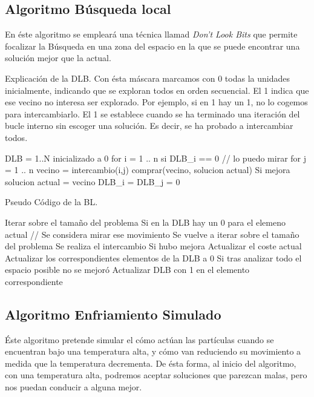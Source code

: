 \documentclass[10pt,a4paper]{article}
\begin{document}
\subsection{Algoritmo Búsqueda local}

En éste algoritmo se empleará una técnica llamad \textit{Don't Look Bits} que permite focalizar la Búsqueda en una zona del espacio en la que se puede encontrar una solución mejor que la actual.

Explicación de la DLB. Con ésta máscara marcamos con 0 todas la unidades inicialmente, indicando que se exploran todos en  orden secuencial. El 1 indica que ese vecino no interesa ser explorado. Por ejemplo, si en 1 hay un 1, no lo cogemos para intercambiarlo. El 1 se establece cuando se ha terminado una iteración del bucle interno sin escoger una solución. Es decir, se ha probado a intercambiar todos.

\begin{ccode}
        DLB = 1..N inicializado a 0
        for i = 1 .. n
            si DLB_i == 0 // lo puedo mirar
                for j = 1 .. n
                    vecino = intercambio(i,j)
                    comprar(vecino, solucion actual)
                    Si mejora solucion actual = vecino
                    DLB_i = DLB_j = 0
\end{ccode}
Pseudo Código de la BL.
\begin{ccode}
    Iterar sobre el tamaño del problema
        Si en la DLB hay un 0 para el elemeno actual // Se considera mirar ese movimiento
            Se vuelve a iterar sobre el tamaño del problema
                Se realiza el intercambio
                Si hubo mejora
                    Actualizar el coste actual
                    Actualizar los correspondientes elementos de la DLB a 0
            Si tras analizar todo el espacio posible no se mejoró
                Actualizar DLB con 1 en el elemento correspondiente
\end{ccode}

\subsection{Algoritmo Enfriamiento Simulado}

Éste algoritmo pretende simular el cómo actúan las partículas cuando se encuentran bajo una temperatura alta, y cómo van reduciendo su movimiento a medida que la temperatura decrementa. De ésta forma, al inicio del algoritmo, con una temperatura alta, podremos aceptar soluciones que parezcan malas, pero nos puedan conducir a alguna mejor.
\end{document}

